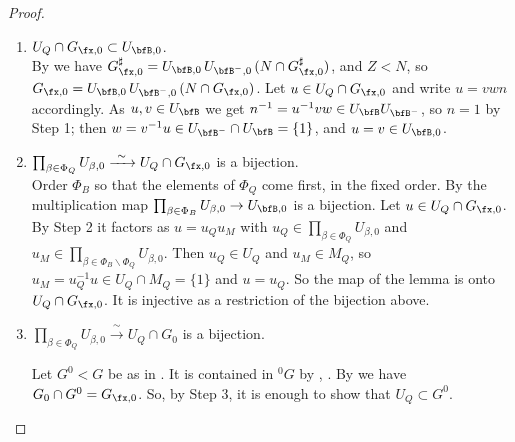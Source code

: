 \documentclass[12pt,a4paper]{amsart}%
\newcommand{\RamiC}[1]{{{#1}}}
\newcommand{\DimaB}[1]{{{#1}}}
\begin{document}
\begin{proof}
\begin{enumerate}[Step 1.]
\item $U_Q\cap G_{\RamiC{\fx,}0}\subset U_{\bfB,0}$.\\
By \cite[Proposition 7.3.12(1)]{KP} we have
$G^\sharp_{\fx,0}=U_{\bfB,0}\,U_{\bfB^-,0}\,(N\cap G^\sharp_{\fx,0})$, and $Z<N$, so
$G_{\RamiC{\fx,}0}=U_{\bfB,0}\,U_{\bfB^-,0}\,(N\cap G_{\RamiC{\fx,}0})$. Let $u\in U_Q\cap G_{\RamiC{\fx,}0}$ and write $u=vwn$
accordingly. As $u,v\in U_\bfB$ we get $n^{-1}=u^{-1}vw\in U_\bfB U_{\bfB^-}$, so $n=1$ by Step 1; then
$w=v^{-1}u\in U_{\bfB^-}\cap U_\bfB=\{1\}$, and $u=v\in U_{\bfB,0}$.

\item \RamiC{$
\prod_{\beta\in\Phi_Q}U_{\beta,0}\xrightarrow{\ \sim\ }U_Q\cap G_{{\fx,}0}
$
is a bijection}.\\
Order $\Phi_B$ so that the elements of $\Phi_Q$ come first, in the
fixed order. By \cite[Proposition 7.3.12(3)]{KP} the multiplication map
$\prod_{\beta\in\Phi_B}U_{\beta,0}\to U_{\bfB,0}$ is a bijection. Let $u\in U_Q\cap G_{\RamiC{\fx,}0}$. By
Step 2 it factors as $u=u_Qu_M$ with $u_Q\in\prod_{\beta\in\Phi_Q}U_{\beta,0}$ and
$u_M\in\prod_{\beta\in\Phi_B\smallsetminus\Phi_Q}U_{\beta,0}$. Then $u_Q\in U_Q$ and
$u_M\in M_Q$, so $u_M=u_Q^{-1}u\in U_Q\cap M_Q=\{1\}$ and $u=u_Q$. 
\DimaB{So} the map of
the lemma is onto $U_Q\cap G_{\RamiC{\fx,}0}$\RamiC{. I}t is injective as a restriction of the bijection above. 
\item \RamiC{$
\prod_{\beta\in\Phi_Q}U_{\beta,0}\xrightarrow{\ \sim\ }U_Q\cap G_{0}
$
is a bijection}.\\
\RamiC{Let $G^0<G$ be as in \cite[Definition 2.6.23]{KP}. 
It is contained in  $^0G$ by \cite[Notation 2.6.15, Lemma 11.5.2, Lemma 2.6.16(4)]{KP},  
\cite[V.2.3]{Ren}. 
By
\cite[Proposition 7.6.4(1)]{KP} we have 
$G_{0}\cap G^0=G_{\fx,0}$.
So, by Step 3, it is enough to show that
$U_Q\subset G^0$.

}
\end{enumerate}
\end{proof}
\end{document}
